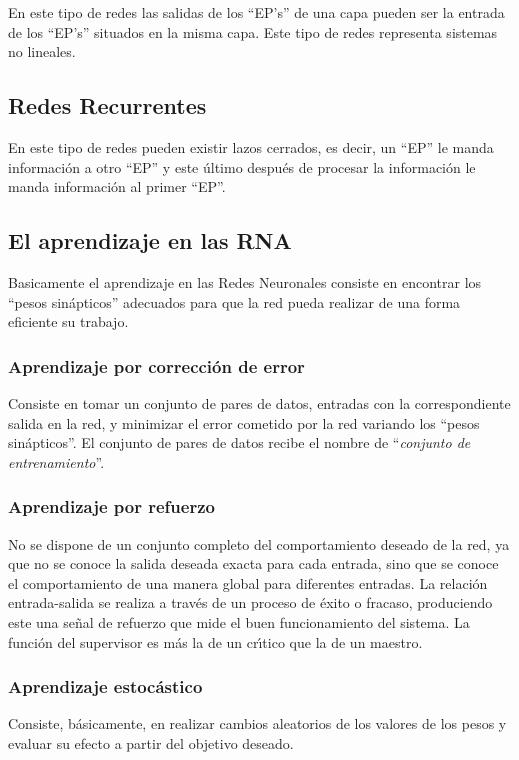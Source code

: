 En este tipo de redes las salidas de los ``EP's'' de una capa pueden ser la 
entrada de los ``EP's'' situados en la misma capa. Este tipo de redes representa
sistemas no lineales.

\subsection{Redes Recurrentes}

En este tipo de redes pueden existir lazos cerrados, es decir, un ``EP'' le
manda informaci\'on a otro ``EP'' y este \'ultimo despu\'es de procesar la
informaci\'on le manda informaci\'on al primer ``EP''.

\subsection{El aprendizaje en las RNA}

Basicamente el aprendizaje en las Redes Neuronales consiste en encontrar los
``pesos sin\'apticos'' adecuados para que la red pueda realizar de una forma
eficiente su trabajo.

\subsubsection{Aprendizaje por correcci\'on de error}

Consiste en tomar un conjunto de pares de datos, entradas con la correspondiente
salida en la red, y minimizar el error cometido por la red variando los ``pesos
sin\'apticos''. El conjunto de pares de datos recibe el nombre de
``\emph{conjunto de entrenamiento}''.

\subsubsection{Aprendizaje por refuerzo}

No se dispone de un conjunto completo del comportamiento deseado de la red, ya
que no se conoce la salida deseada exacta para cada entrada, sino que se conoce
el comportamiento de una manera global para diferentes entradas. La relaci\'on
entrada-salida se realiza a trav\'es de un proceso de \'exito o fracaso,
produciendo este una se\~nal de refuerzo que mide el buen funcionamiento del
sistema. La funci\'on del supervisor es m\'as la de un cr\'{\i}tico que la de
un maestro.

\subsubsection{Aprendizaje estoc\'astico}

Consiste, b\'asicamente, en realizar cambios aleatorios de los valores de los 
pesos y evaluar su efecto a partir del objetivo deseado.
